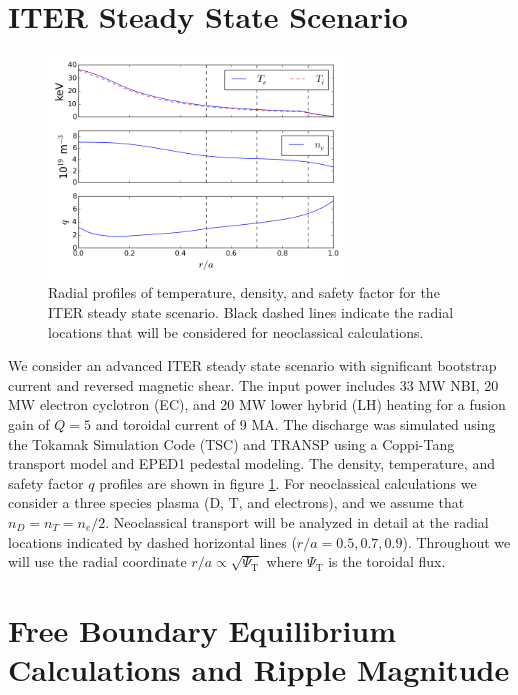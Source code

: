 \documentclass[aip, pop, preprint]{revtex4-1}
\numberwithin{figure}{section}
\numberwithin{equation}{section}
\begin{document}
\section{ITER Steady State Scenario}\label{steadystate}

\FloatBarrier

\begin{figure}[h!]
\centering
\includegraphics[width=0.7\textwidth]{profiles.png}
\caption{\label{fig:profiles} Radial profiles of temperature, density, and safety factor for the ITER steady state scenario.\cite{Poli2014} Black dashed lines indicate the radial locations that will be considered for neoclassical calculations.}
\end{figure}

We consider an advanced ITER steady state scenario with significant bootstrap current and reversed magnetic shear.\cite{Poli2014} The input power includes 33 MW NBI, 20 MW electron cyclotron (EC), and 20 MW lower hybrid (LH) heating for a fusion gain of $Q = 5$ and toroidal current of 9 MA. The discharge was simulated using the Tokamak Simulation Code (TSC) \cite{Jardin1986} and TRANSP \cite{Hawryluk1980} using a Coppi-Tang \cite{Jardin1993} transport model and EPED1 \cite{Snyder2011} pedestal modeling. The density, temperature, and safety factor $q$ profiles are shown in figure \ref{fig:profiles}. For neoclassical calculations we consider a three species plasma (D, T, and electrons), and we assume that $n_D = n_T = n_e/2$. Neoclassical transport will be analyzed in detail at the radial locations indicated by dashed horizontal lines ($r/a = 0.5, 0.7, 0.9$). Throughout we will use the radial coordinate $r/a \propto \sqrt{\Psi_{\text{T}}}$ where $\Psi_{\text{T}}$ is the toroidal flux.

\FloatBarrier

\section{Free Boundary Equilibrium Calculations and Ripple Magnitude} \label{vmec}
\end{document}
